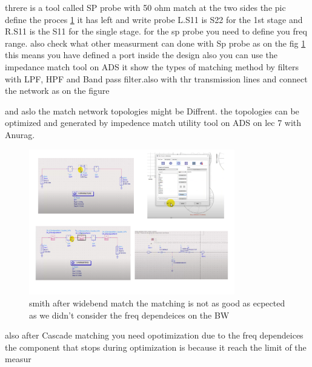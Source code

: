 \documentclass{article}
\begin{document}
\begin{itemize}
threre is a tool called SP probe with 50 ohm match at the two sides the pic define the proces \cref{Anurug rf6_4}
it has left and write probe L.S11 is S22 for the 1st stage and R.S11 is the S11 for the single stage. for the sp probe you need to define you freq range. also check what other measurment can done with Sp probe as on the fig \cref{Anurug rf6_4}
this means you have defined a port inside the design 
also you can use the impedance match tool on ADS it show the types of matching method by filters with LPF, HPF and Band pass filter.also with thr transmission lines 
and connect the network as on the  figure 

and aslo the match network topologies might be Diffrent. the topologies can be optimized and generated by impedence match utility tool on ADS on lec 7 with Anurag.

\begin{figure}[H]
    \centering
    \includegraphics[width=0.8\textwidth]{figures/Anurug rf6_4.pdf}
    \caption{smith after widebend match the matching is not as good as ecpected as we didn't consider the freq dependeices on the BW }
    \label{Anurug rf6_4}
\end{figure}
 
also after Cascade matching you need opotimization due to the freq dependeices 
the component that stops during optimization is because it reach the limit of the measur 





















\end{itemize}
\end{document}
